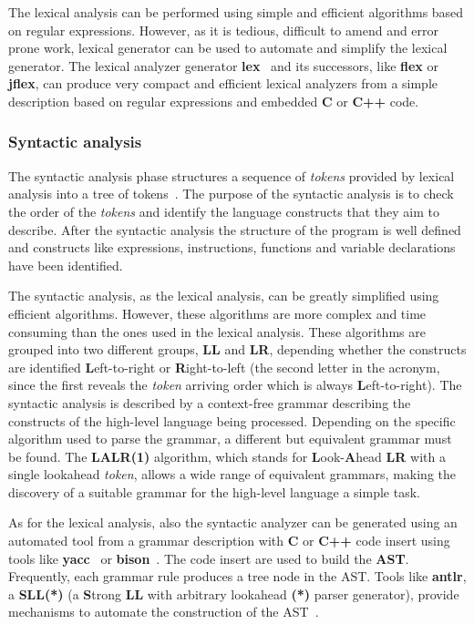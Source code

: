 The lexical analysis can be performed using simple and efficient algorithms
based on regular expressions.  However, as it is tedious, difficult to amend and
error prone work, lexical generator can be used to automate and simplify the
lexical generator.  The lexical analyzer generator {\bf lex}~\cite{Lesk:lex} and
its successors, like {\bf flex} or {\bf jflex}, can produce very compact and
efficient lexical analyzers from a simple description based on regular
expressions and embedded {\bf C} or {\bf C++} code.

\subsubsection{Syntactic analysis}\label{yacc}

The syntactic analysis phase structures a sequence of {\em tokens} provided by
lexical analysis into a tree of tokens~\cite{schreiner85,lexyacc95}.  The
purpose of the syntactic analysis is to check the order of the {\em tokens} and
identify the language constructs that they aim to describe.  After the syntactic
analysis the structure of the program is well defined and constructs like
expressions, instructions, functions and variable declarations have been
identified.

The syntactic analysis, as the lexical analysis, can be greatly simplified using
efficient algorithms.  However, these algorithms are more complex and time
consuming than the ones used in the lexical analysis.  These algorithms are
grouped into two different groups, {\bf LL} and {\bf LR}, depending whether the
constructs are identified {\bf L}eft-to-right or {\bf R}ight-to-left (the second
letter in the acronym, since the first reveals the {\em token} arriving order
which is always {\bf L}eft-to-right).  The syntactic analysis is described by a
context-free grammar describing the constructs of the high-level language being
processed.  Depending on the specific algorithm used to parse the grammar, a
different but equivalent grammar must be found.  The {\bf LALR(1)} algorithm,
which stands for {\bf L}ook-{\bf A}head {\bf LR} with a single lookahead {\em
  token}, allows a wide range of equivalent grammars, making the discovery of a
suitable grammar for the high-level language a simple task.

As for the lexical analysis, also the syntactic analyzer can be generated using
an automated tool from a grammar description with {\bf C} or {\bf C++} code
insert using tools like {\bf yacc}~\cite{Johnson:yacc} or {\bf
  bison}~\cite{donnelly03}.  The code insert are used to build the {\bf AST}.
Frequently, each grammar rule produces a tree node in the {\sc AST}.
Tools like {\bf antlr}, a {\bf SLL(*)} (a {\bf S}trong {\bf LL} with
arbitrary lookahead {\bf (*)} parser generator), provide mechanisms to
automate the construction of the {\sc AST}~\cite{parr07}.


